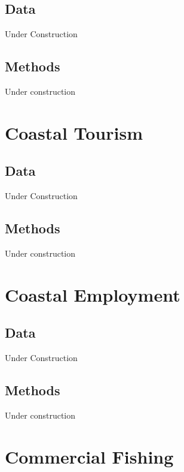 \documentclass[
]{book}
\begin{document}
\hypertarget{data-12}{%
\section{Data}\label{data-12}}

Under Construction

\hypertarget{methods-12}{%
\section{Methods}\label{methods-12}}

Under construction

\hypertarget{coastal-tourism}{%
\chapter{Coastal Tourism}\label{coastal-tourism}}

\hypertarget{data-13}{%
\section{Data}\label{data-13}}

Under Construction

\hypertarget{methods-13}{%
\section{Methods}\label{methods-13}}

Under construction

\hypertarget{coastal-employment}{%
\chapter{Coastal Employment}\label{coastal-employment}}

\hypertarget{data-14}{%
\section{Data}\label{data-14}}

Under Construction

\hypertarget{methods-14}{%
\section{Methods}\label{methods-14}}

Under construction

\hypertarget{commercial-fishing}{%
\chapter{Commercial Fishing}\label{commercial-fishing}}
\end{document}
